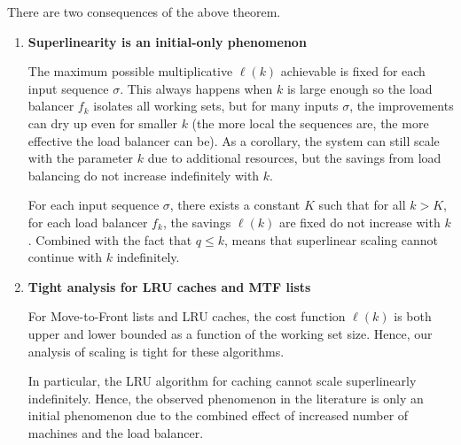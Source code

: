 
There are two consequences of the above theorem. 
\begin{enumerate}
	\item 
\textbf{Superlinearity is an initial-only phenomenon}

The maximum possible multiplicative $\ell(k)$ achievable is fixed for each input sequence $\sigma$. 
This always happens when $k$ is large enough so the load balancer $f_k$ isolates all working sets, but for many inputs $\sigma$, the improvements can dry up even for smaller $k$ (the more local the sequences are, the more effective the load balancer can be).
As a corollary, the system can still scale with the parameter $k$ due to additional resources, but the savings from load balancing do not increase indefinitely with $k$.
\begin{observation}
	\label{obs:initial}
	For each input sequence $\sigma$, there exists a constant $K$ such that for all $k > K$, for each load balancer $f_k$, the savings $\ell(k)$ are fixed do not increase with $k$.
	Combined with the fact that $q \le k$, means that superlinear scaling cannot continue with $k$ indefinitely.
\end{observation}


 \item \textbf{Tight analysis for LRU caches and MTF lists}

For Move-to-Front lists and LRU caches, the cost function $\ell(k)$ is both upper and lower bounded as a function of the working set size. Hence, our analysis of scaling is tight for these algorithms.

In particular, the LRU algorithm for caching cannot scale superlinearly indefinitely. Hence, the observed phenomenon in the literature is only an initial phenomenon due to the combined effect of increased number of machines and the load balancer.
\end{enumerate}







